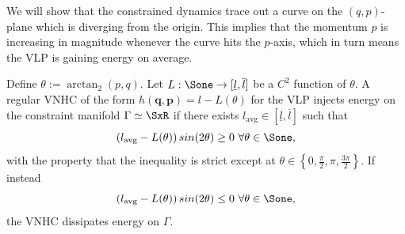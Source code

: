 We will show that the constrained dynamics trace out a curve on the
\((q,p)\)-plane which is diverging from the origin.  
This implies that the momentum \(p\) is increasing in magnitude whenever the
curve hits the \(p\)-axis, which in turn means the VLP is gaining energy on
average.

\begin{thm}\label{thm:vlp-energy-stabilization}
   Define \(\theta := \arctan_2(p,q)\).
   Let \(L : \Sone \rightarrow [\underline{l},\overline{l}]\) be a
   \(C^2\) function of \(\theta\).
   A regular VNHC of the form 
   \(h(\mathbf{q},\mathbf{p}) = l - L(\theta)\) for the VLP injects energy 
   on the constraint manifold \(\Gamma \simeq \SxR\) if there
   exists \(l_\text{avg} \in [\underline{l},\overline{l}]\) such that 
   \begin{equation}\label{eqn:vlp-energy-gain-condition}
      \left(l_\text{avg} - L(\theta)\right)sin(2\theta) \geq 0 
      \text{ }\forall \theta \in \Sone
      ,
   \end{equation}
   with the property that the inequality is strict except at 
   \(\theta \in \left\{0, \frac{\pi}{2}, \pi, \frac{3\pi}{2}\right\}\).  
   If instead 
   \[
    \left(l_\text{avg} - L(\theta)\right)sin(2\theta) \leq 0 
         \text{ }\forall \theta \in \Sone
         ,
   \]
   the VNHC dissipates energy on \(\Gamma\).
\end{thm}
